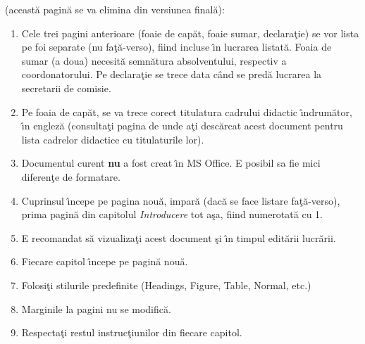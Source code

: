 { (aceast\u{a} pagin\u{a} se va elimina din versiunea final\u{a})}:
\begin{enumerate}
 \item Cele trei pagini anterioare (foaie de cap\u{a}t, foaie sumar, declara\c{t}ie) se vor lista pe foi separate (nu fa\c{t}\u{a}-verso), fiind incluse \^{\i}n lucrarea listat\u{a}. 
 Foaia de sumar (a doua) necesit\u{a} semn\u{a}tura absolventului, respectiv a coordonatorului.
 Pe declara\c{t}ie se trece data c\^{a}nd se pred\u{a} lucrarea la secretarii de comisie.
 \item Pe foaia de cap\u{a}t, se va trece corect titulatura cadrului didactic \^{\i}ndrum\u{a}tor, \^{\i}n englez\u{a} (consulta\c{t}i pagina de unde a\c{t}i desc\u{a}rcat acest document pentru lista cadrelor didactice cu titulaturile lor).
 \item Documentul curent {\bf nu} a fost creat \^{\i}n MS Office. E posibil sa fie mici diferen\c{t}e de formatare. 
\item Cuprinsul \^{\i}ncepe pe pagina nou\u{a}, impar\u{a} (dac\u{a} se face listare fa\c{t}\u{a}-verso), prima pagin\u{a} din capitolul \emph{Introducere} tot a\c{s}a, fiind numerotat\u{a} cu 1. %
\item E recomandat s\u{a} vizualiza\c{t}i acest document \c{s}i \^{\i}n timpul edit\u{a}rii lucr\u{a}rii. %
\item Fiecare capitol \^{\i}ncepe pe pagin\u{a} nou\u{a}. %
\item Folosi\c{t}i stilurile predefinite (Headings, Figure, Table, Normal, etc.)
\item Marginile la pagini nu se modific\u{a}.
\item Respecta\c{t}i restul instruc\c{t}iunilor din fiecare capitol.
\end{enumerate}
